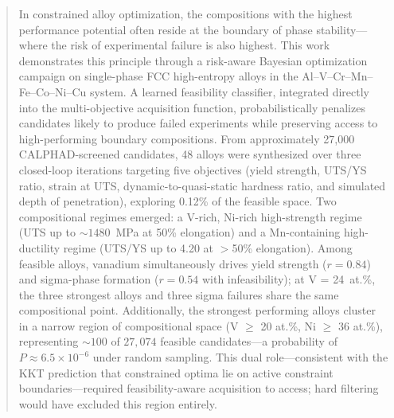\documentclass[preprint,12pt,times]{elsarticle}  %
\begin{document}
\begin{frontmatter}
\address{$^a$Department of Materials Science and Engineering, Texas A\&M University, College Station, TX 77843, USA}
\address{$^b$Mechanical Engineering Department, Texas A\&M University, College Station, TX, USA 77840}
\address{$^c$DEVCOM Army Research Laboratory South at Texas A\&M University, College Station, TX 77843-3003, USA}
\address{$^d$Hopkins Extreme Materials Institute, Johns Hopkins University, Baltimore, Maryland, 21218, USA}
\address{$^e$Bush Combat Development Complex, Texas A\&M University System, 3479 TAMU, College Station, TX 77843-3479, USA}




\begin{abstract}


In constrained alloy optimization, the compositions with the highest performance potential often reside at the boundary of phase stability---where the risk of experimental failure is also highest. This work demonstrates this principle through a risk-aware Bayesian optimization campaign on single-phase FCC high-entropy alloys in the Al--V--Cr--Mn--Fe--Co--Ni--Cu system. A learned feasibility classifier, integrated directly into the multi-objective acquisition function, probabilistically penalizes candidates likely to produce failed experiments while preserving access to high-performing boundary compositions. From approximately 27{,}000 CALPHAD-screened candidates, 48 alloys were synthesized over three closed-loop iterations targeting five objectives (yield strength, UTS/YS ratio, strain at UTS, dynamic-to-quasi-static hardness ratio, and simulated depth of penetration), exploring 0.12\% of the feasible space. Two compositional regimes emerged: a V-rich, Ni-rich high-strength regime (UTS up to ${\sim}1480$~MPa at 50\% elongation) and a Mn-containing high-ductility regime (UTS/YS up to 4.20 at $>$50\% elongation). Among feasible alloys, vanadium simultaneously drives yield strength ($r = 0.84$) and sigma-phase formation ($r = 0.54$ with infeasibility); at V = 24~at.\%, the three strongest alloys and three sigma failures share the same compositional point. Additionally, the strongest performing alloys cluster in a narrow region of compositional space (V $\geq$ 20 at.\%, Ni $\geq$ 36 at.\%), representing ${\sim}100$ of $27{,}074$ feasible candidates---a probability of $P \approx 6.5 \times 10^{-6}$ under random sampling. This dual role---consistent with the KKT prediction that constrained optima lie on active constraint boundaries---required feasibility-aware acquisition to access; hard filtering would have excluded this region entirely.



\end{abstract}
\end{frontmatter}
\end{document}
